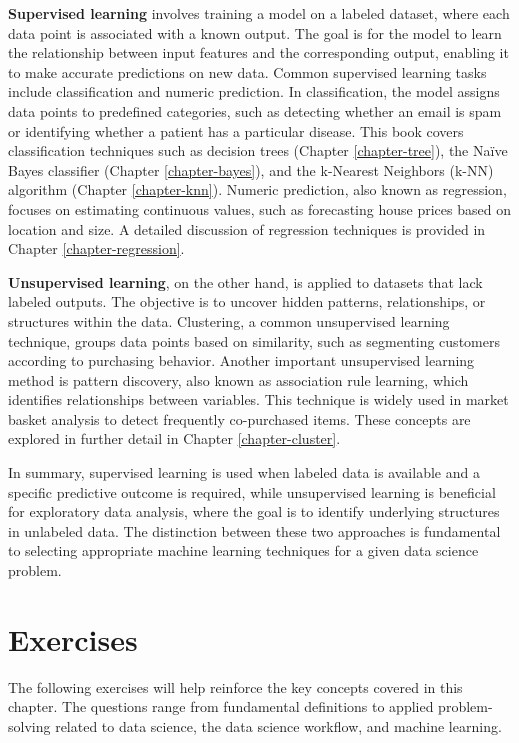 \documentclass[
]{book}
\theoremstyle{definition}
\theoremstyle{definition}
\theoremstyle{definition}
\theoremstyle{definition}
\theoremstyle{remark}
\begin{document}
\textbf{Supervised learning} involves training a model on a labeled dataset, where each data point is associated with a known output. The goal is for the model to learn the relationship between input features and the corresponding output, enabling it to make accurate predictions on new data. Common supervised learning tasks include classification and numeric prediction. In classification, the model assigns data points to predefined categories, such as detecting whether an email is spam or identifying whether a patient has a particular disease. This book covers classification techniques such as decision trees (Chapter \ref{chapter-tree}), the Naïve Bayes classifier (Chapter \ref{chapter-bayes}), and the k-Nearest Neighbors (k-NN) algorithm (Chapter \ref{chapter-knn}). Numeric prediction, also known as regression, focuses on estimating continuous values, such as forecasting house prices based on location and size. A detailed discussion of regression techniques is provided in Chapter \ref{chapter-regression}.

\textbf{Unsupervised learning}, on the other hand, is applied to datasets that lack labeled outputs. The objective is to uncover hidden patterns, relationships, or structures within the data. Clustering, a common unsupervised learning technique, groups data points based on similarity, such as segmenting customers according to purchasing behavior. Another important unsupervised learning method is pattern discovery, also known as association rule learning, which identifies relationships between variables. This technique is widely used in market basket analysis to detect frequently co-purchased items. These concepts are explored in further detail in Chapter \ref{chapter-cluster}.

In summary, supervised learning is used when labeled data is available and a specific predictive outcome is required, while unsupervised learning is beneficial for exploratory data analysis, where the goal is to identify underlying structures in unlabeled data. The distinction between these two approaches is fundamental to selecting appropriate machine learning techniques for a given data science problem.

\section{Exercises}\label{exercises}

The following exercises will help reinforce the key concepts covered in this chapter. The questions range from fundamental definitions to applied problem-solving related to data science, the data science workflow, and machine learning.
\end{document}
